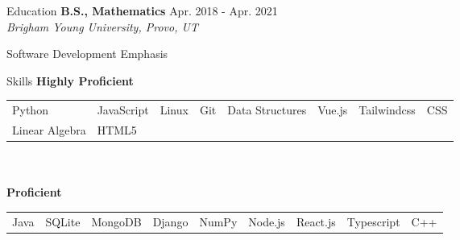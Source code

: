 \documentclass{resume} %
\begin{document}
\begin{rSection}{Education}
{\bf B.S., Mathematics }\hfill {Apr. 2018 - Apr. 2021} \\
\textit{Brigham Young University, Provo, UT}
    \begin{compactitem}
        \item Software Development Emphasis
    \end{compactitem}
\end{rSection}

\begin{rSection}{Skills}
    \textbf{Highly Proficient}\\
        \begin{tabular}{ l l l l l l l l }
            Python & JavaScript & Linux & Git & Data Structures & Vue.js &  Tailwindcss & CSS\\
            Linear Algebra  & HTML5 
        \end{tabular}\\\\
    \textbf{Proficient}\\
        \begin{tabular}{ l l l l l l l l l }
            Java &  SQLite & MongoDB & Django & NumPy & Node.js & React.js & Typescript & C++ 
        \end{tabular}
\end{rSection}
\end{document}
